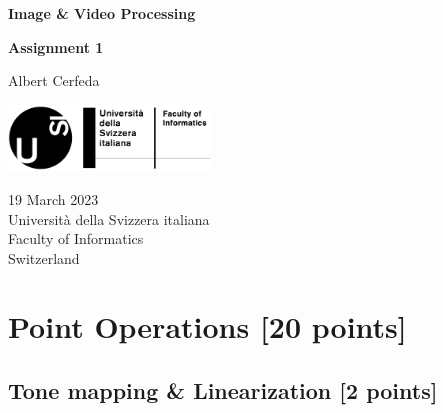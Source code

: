 \documentclass[tikz,14pt,fleqn]{article}
\newcommand\namesurname{Albert Cerfeda}
\newcommand\assignment{Assignment 1}
\newcommand\subject{Image \& Video Processing}
\newcommand\documentdate{19 March 2023}
\begin{document}
\begin{titlepage}
   \begin{center}
       \vspace*{0.2cm}

       \textbf{\Large{\subject}}

       \vspace{0.5cm}
        \textbf{\assignment}\\[5mm]
        
            
       \vspace{0.4cm}

        \namesurname
        \begin{figure}[H]
            \centering
        \end{figure}
       \tableofcontents

       \vspace*{\fill}
     
        \includegraphics[width=0.4\textwidth]{fig/logo.png}
       
        \documentdate \\
        Università della Svizzera italiana\\
        Faculty of Informatics\\
        Switzerland\\

   \end{center}
\end{titlepage}

\section{Point Operations [20 points]}


\subsection{Tone mapping \& Linearization [2 points]}
\end{document}

